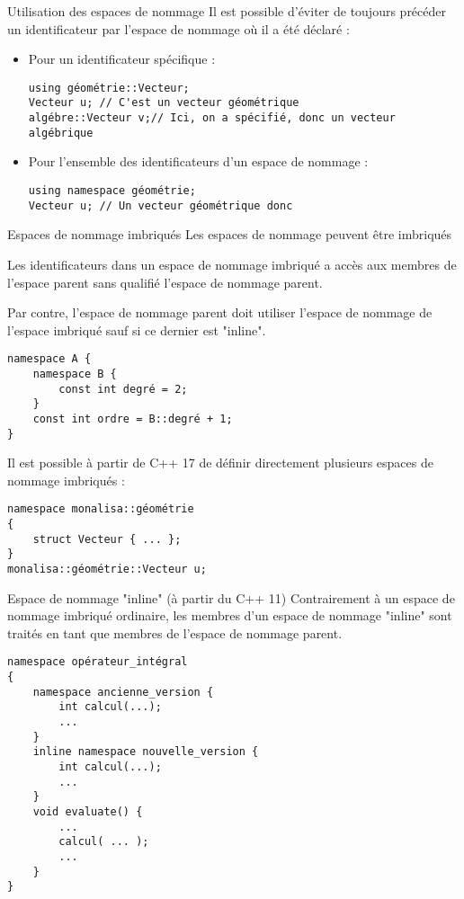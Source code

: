 \documentclass[compress,10pt,aspectratio=169]{beamer}
\begin{document}
\begin{frame}[fragile]{Utilisation des espaces de nommage}
    \scriptsize
    Il est possible d'éviter de toujours précéder un identificateur par l'espace de nommage où il a été déclaré :
    \begin{itemize}
    \item Pour un identificateur spécifique :
    \begin{verbatim}
using géométrie::Vecteur;
Vecteur u; // C'est un vecteur géométrique 
algébre::Vecteur v;// Ici, on a spécifié, donc un vecteur algébrique
    \end{verbatim}
    \item Pour l'ensemble des identificateurs d'un espace de nommage :
    \begin{verbatim}
using namespace géométrie;
Vecteur u; // Un vecteur géométrique donc
    \end{verbatim}
    \end{itemize}

\end{frame}

\begin{frame}[fragile]{Espaces de nommage imbriqués}
    \scriptsize 
    Les espaces de nommage peuvent être imbriqués

    Les identificateurs dans un espace de nommage imbriqué a accès aux membres de l'espace parent sans qualifié l'espace de nommage parent.

    Par contre, l'espace de nommage parent doit utiliser l'espace de nommage de l'espace imbriqué sauf si ce dernier est "inline".
    \begin{verbatim}
namespace A {
    namespace B {
        const int degré = 2;
    }
    const int ordre = B::degré + 1;
}
    \end{verbatim}
    Il est possible à partir de C++ 17 de définir directement plusieurs espaces de nommage imbriqués :
\begin{verbatim}
namespace monalisa::géométrie
{
    struct Vecteur { ... };
}
monalisa::géométrie::Vecteur u;
\end{verbatim}
\end{frame}

\begin{frame}[fragile]{Espace de nommage "inline" (à partir du C++ 11)}
\scriptsize
Contrairement à un espace de nommage imbriqué ordinaire, les membres d'un espace de nommage "inline" sont traités en tant que membres de l'espace de nommage parent.

\begin{verbatim}
namespace opérateur_intégral
{
    namespace ancienne_version {
        int calcul(...);
        ...
    }
    inline namespace nouvelle_version {
        int calcul(...);
        ...
    }
    void evaluate() {
        ... 
        calcul( ... );
        ...
    }
}
\end{verbatim}
\end{frame}
\end{document}
